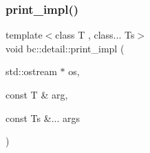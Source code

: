 \subsubsection{\texorpdfstring{print\+\_\+impl()}{print\_impl()}\hspace{0.1cm}{\footnotesize\ttfamily [2/2]}}
{\footnotesize\ttfamily template$<$class T , class... Ts$>$ \\
void bc\+::detail\+::print\+\_\+impl (\begin{DoxyParamCaption}\item[{std\+::ostream $\ast$}]{os,  }\item[{const T \&}]{arg,  }\item[{const Ts \&...}]{args }\end{DoxyParamCaption})}


